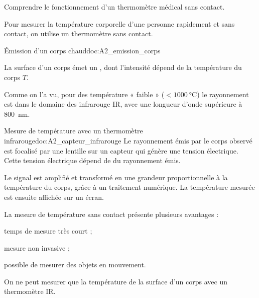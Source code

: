 \tetePremStssLumi

\vspace*{-32pt}


\begin{objectifs}
  \item Comprendre le fonctionnement d'un thermomètre médical sans contact.
\end{objectifs}

\begin{contexte}
  Pour mesurer la température corporelle d'une personne rapidement et sans contact, on utilise un thermomètre sans contact.
  
\end{contexte}


\begin{doc}{Émission d'un corps chaud}{doc:A2_emission_corps}
  \begin{importants}
    La surface d'un corps émet un , dont l'intensité dépend de la température du corps $T$.
  \end{importants}

  Comme on l'a vu, pour des température « faible » ($< \qty{1000}{\degreeCelsius}$) le rayonnement est dans le domaine des infrarouge IR, avec une longueur d'onde supérieure à \qty{800}{\nm}.
\end{doc}

\begin{doc}{Mesure de température avec un thermomètre infrarouge}{doc:A2_capteur_infrarouge}
  Le rayonnement émis par le corps observé est focalisé par une lentille sur un capteur qui génère une tension électrique.
  Cette tension électrique dépend de  du rayonnement émis.
  
  Le signal est amplifié et transformé en une grandeur proportionnelle à la température du corps, grâce à un traitement numérique.
  La température mesurée est ensuite affichée sur un écran.

  La mesure de température sans contact présente plusieurs avantages :
  \begin{listePoints}
    \item temps de mesure très court ;
    \item mesure non invasive ;
    \item possible de mesurer des objets en mouvement.
  \end{listePoints}

  \begin{center}
  \end{center}

  On ne peut mesurer que la température de la surface d'un corps avec un thermomètre IR.
\end{doc}


